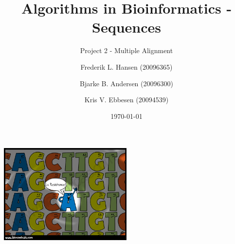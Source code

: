 \documentclass[a4paper, 12pt]{scrartcl}
\title{Algorithms in Bioinformatics - Sequences}
\subtitle{Project 2 - Multiple Alignment}
\date{\today}
\author{Frederik L. Hansen (20096365)
\and
Bjarke B. Andersen (20096300)
\and
Kris V. Ebbesen (20094539)
}
\begin{document}
\maketitle
\begin{center}
	\includegraphics[width=0.5\textwidth]{MSA.png}
\end{center}
\newpage
\tableofcontents
\newpage













 
\end{document}
